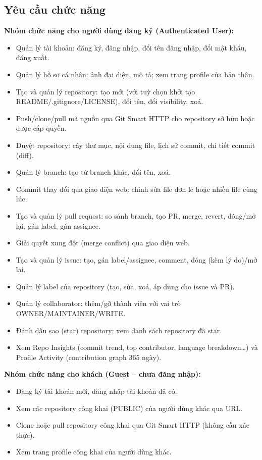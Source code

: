 \subsection{Yêu cầu chức năng}
\textbf{Nhóm chức năng cho người dùng đăng ký (Authenticated User):}
\begin{itemize}
\item Quản lý tài khoản: đăng ký, đăng nhập, đổi tên đăng nhập, đổi mật khẩu, đăng xuất.
\item Quản lý hồ sơ cá nhân: ảnh đại diện, mô tả; xem trang profile của bản thân.
\item Tạo và quản lý repository: tạo mới (với tuỳ chọn khởi tạo README/.gitignore/LICENSE), đổi tên, đổi visibility, xoá.
\item Push/clone/pull mã nguồn qua Git Smart HTTP cho repository sở hữu hoặc được cấp quyền.
\item Duyệt repository: cây thư mục, nội dung file, lịch sử commit, chi tiết commit (diff).
\item Quản lý branch: tạo từ branch khác, đổi tên, xoá.
\item Commit thay đổi qua giao diện web: chỉnh sửa file đơn lẻ hoặc nhiều file cùng lúc.
\item Tạo và quản lý pull request: so sánh branch, tạo PR, merge, revert, đóng/mở lại, gán label, gán assignee.
\item Giải quyết xung đột (merge conflict) qua giao diện web.
\item Tạo và quản lý issue: tạo, gán label/assignee, comment, đóng (kèm lý do)/mở lại.
\item Quản lý label của repository (tạo, sửa, xoá, áp dụng cho issue và PR).
\item Quản lý collaborator: thêm/gỡ thành viên với vai trò OWNER/MAINTAINER/WRITE.
\item Đánh dấu sao (star) repository; xem danh sách repository đã star.
\item Xem Repo Insights (commit trend, top contributor, language breakdown\ldots) và Profile Activity (contribution graph 365 ngày).
\end{itemize}

\textbf{Nhóm chức năng cho khách (Guest -- chưa đăng nhập):}
\begin{itemize}
\item Đăng ký tài khoản mới, đăng nhập tài khoản đã có.
\item Xem các repository công khai (PUBLIC) của người dùng khác qua URL.
\item Clone hoặc pull repository công khai qua Git Smart HTTP (không cần xác thực).
\item Xem trang profile công khai của người dùng khác.
\end{itemize}

